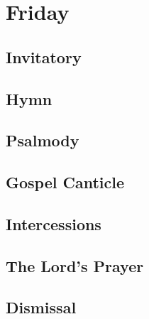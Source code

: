 \section[Friday]{Friday}
\begin{english}
\subsection*{Invitatory}




\subsection*{Hymn}

\subsection*{Psalmody}







\newpage 

\subsection*{Gospel Canticle}


\subsection*{Intercessions}


\subsection*{The Lord’s Prayer}


\newpage 

\subsection*{Dismissal}

\end{english}

\newpage
